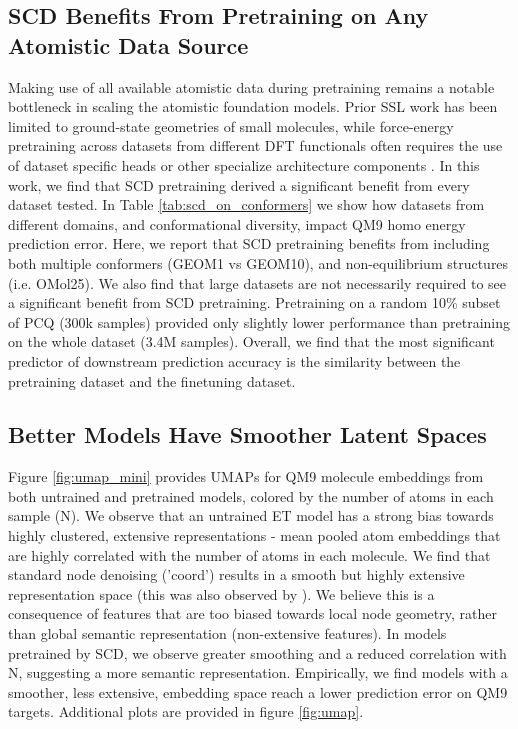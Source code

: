 \documentclass{article}
\theoremstyle{plain}
\theoremstyle{definition}
\theoremstyle{remark}
\begin{document}
\subsection{SCD Benefits From Pretraining on Any Atomistic Data Source}
Making use of all available atomistic data during pretraining remains a notable bottleneck in scaling the atomistic foundation models. Prior SSL work has been limited to ground-state geometries of small molecules\cite{Frad_Ni2024,SliDe_Ni2025, UniCorn_Feng2024}, while force-energy pretraining across datasets from different DFT functionals often requires the use of dataset specific heads or other specialize architecture components \cite{JMP_Shoghi2023,UMA_wood2025}. In this work, we find that SCD pretraining derived a significant benefit from every dataset tested. In Table \ref{tab:scd_on_conformers} we show how datasets from different domains, and conformational diversity, impact QM9 homo energy prediction error. Here, we report that SCD pretraining benefits from including both multiple conformers (GEOM1 vs GEOM10), and non-equilibrium structures (i.e. OMol25). We also find that large datasets are not necessarily required to see a significant benefit from SCD pretraining. Pretraining on a random 10\% subset of PCQ (300k samples) provided only slightly lower performance than pretraining on the whole dataset (3.4M samples). Overall, we find that the most significant predictor of downstream prediction accuracy is the similarity between the pretraining dataset and the finetuning dataset.
 


\subsection{Better Models Have Smoother Latent Spaces}
Figure \ref{fig:umap_mini} provides UMAPs for QM9 molecule embeddings from both untrained and pretrained models, colored by the number of atoms in each sample (N). We observe that an untrained ET model has a strong bias towards highly clustered, extensive representations - mean pooled atom embeddings that are highly correlated with the number of atoms in each molecule. We find that standard node denoising ('coord') results in a smooth but highly extensive representation space (this was also observed by \cite{GeomRep_li2024}). We believe this is a consequence of features that are too biased towards local node geometry, rather than global semantic representation (non-extensive features). In models pretrained by SCD, we observe greater smoothing and a reduced correlation with N, suggesting a more semantic representation. Empirically, we find models with a smoother, less extensive, embedding space reach a lower prediction error on QM9 targets. Additional plots are provided in figure \ref{fig:umap}. 
\end{document}
